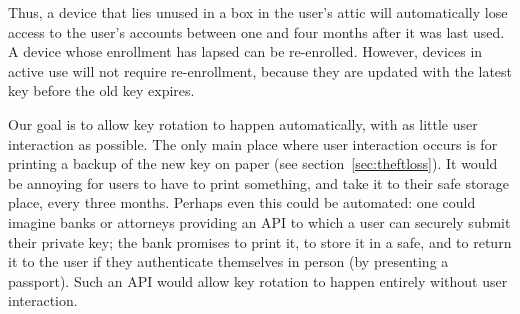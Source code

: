 Thus, a device that lies unused in a box in the user's attic will automatically lose access to the
user's accounts between one and four months after it was last used. A device whose enrollment has
lapsed can be re-enrolled. However, devices in active use will not require re-enrollment, because
they are updated with the latest key before the old key expires.

Our goal is to allow key rotation to happen automatically, with as little user interaction as
possible. The only main place where user interaction occurs is for printing a backup of the new key
on paper (see section~\ref{sec:theftloss}). It would be annoying for users to have to print
something, and take it to their safe storage place, every three months. Perhaps even this could be
automated: one could imagine banks or attorneys providing an API to which a user can securely submit
their private key; the bank promises to print it, to store it in a safe, and to return it to the
user if they authenticate themselves in person (by presenting a passport). Such an API would allow
key rotation to happen entirely without user interaction.
